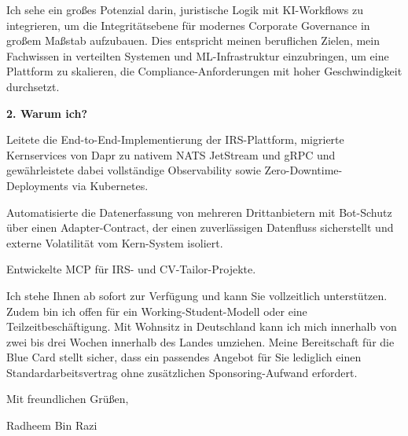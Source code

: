 \documentclass[11pt,a4paper]{coverletter}
\begin{document}
Ich sehe ein großes Potenzial darin, juristische Logik mit KI-Workflows zu integrieren, um die Integritätsebene für modernes Corporate Governance in großem Maßstab aufzubauen. Dies entspricht meinen beruflichen Zielen, mein Fachwissen in verteilten Systemen und ML-Infrastruktur einzubringen, um eine Plattform zu skalieren, die Compliance-Anforderungen mit hoher Geschwindigkeit durchsetzt.

\vspace{8pt}\noindent\textbf{2. Warum ich?}\par\vspace{3pt}

\bullets

  \item Leitete die End-to-End-Implementierung der IRS-Plattform, migrierte Kernservices von Dapr zu nativem NATS JetStream und gRPC und gewährleistete dabei vollständige Observability sowie Zero-Downtime-Deployments via Kubernetes.

  \item Automatisierte die Datenerfassung von mehreren Drittanbietern mit Bot-Schutz über einen Adapter-Contract, der einen zuverlässigen Datenfluss sicherstellt und externe Volatilität vom Kern-System isoliert.

  \item Entwickelte MCP für IRS- und CV-Tailor-Projekte.

\bulletsend

Ich stehe Ihnen ab sofort zur Verfügung und kann Sie vollzeitlich unterstützen. Zudem bin ich offen für ein Working-Student-Modell oder eine Teilzeitbeschäftigung. Mit Wohnsitz in Deutschland kann ich mich innerhalb von zwei bis drei Wochen innerhalb des Landes umziehen. Meine Bereitschaft für die Blue Card stellt sicher, dass ein passendes Angebot für Sie lediglich einen Standardarbeitsvertrag ohne zusätzlichen Sponsoring-Aufwand erfordert.

\closing{Mit freundlichen Grüßen,}{Radheem Bin Razi}
\end{document}
